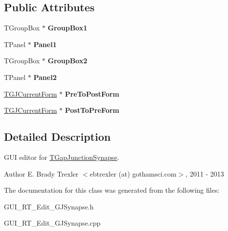 \subsection*{Public Attributes}
\begin{DoxyCompactItemize}
\item 
\hypertarget{class_t_gap_junction_synapse_form_a0b7aef4edb14bd866b8302c7516a45e2}{T\+Group\+Box $\ast$ {\bfseries Group\+Box1}}\label{class_t_gap_junction_synapse_form_a0b7aef4edb14bd866b8302c7516a45e2}

\item 
\hypertarget{class_t_gap_junction_synapse_form_a6b1b55bbe0f87f81ad8cc6ed4c2b0d0c}{T\+Panel $\ast$ {\bfseries Panel1}}\label{class_t_gap_junction_synapse_form_a6b1b55bbe0f87f81ad8cc6ed4c2b0d0c}

\item 
\hypertarget{class_t_gap_junction_synapse_form_a24b399fcc515a4df0c78f98985561bb5}{T\+Group\+Box $\ast$ {\bfseries Group\+Box2}}\label{class_t_gap_junction_synapse_form_a24b399fcc515a4df0c78f98985561bb5}

\item 
\hypertarget{class_t_gap_junction_synapse_form_a63a81abf58ffed566dacd8a285ede1e2}{T\+Panel $\ast$ {\bfseries Panel2}}\label{class_t_gap_junction_synapse_form_a63a81abf58ffed566dacd8a285ede1e2}

\item 
\hypertarget{class_t_gap_junction_synapse_form_af3abdda14fac4735ed075a15730b847a}{\hyperlink{class_t_g_j_current_form}{T\+G\+J\+Current\+Form} $\ast$ {\bfseries Pre\+To\+Post\+Form}}\label{class_t_gap_junction_synapse_form_af3abdda14fac4735ed075a15730b847a}

\item 
\hypertarget{class_t_gap_junction_synapse_form_a336e0fd04c208767a9ab1b087a958230}{\hyperlink{class_t_g_j_current_form}{T\+G\+J\+Current\+Form} $\ast$ {\bfseries Post\+To\+Pre\+Form}}\label{class_t_gap_junction_synapse_form_a336e0fd04c208767a9ab1b087a958230}

\end{DoxyCompactItemize}


\subsection{Detailed Description}
G\+U\+I editor for \hyperlink{class_t_gap_junction_synapse}{T\+Gap\+Junction\+Synapse}. 

\begin{DoxyAuthor}{Author}
E. Brady Trexler $<$ebtrexler (at) gothamsci.\+com$>$, 2011 -\/ 2013 
\end{DoxyAuthor}


The documentation for this class was generated from the following files\+:\begin{DoxyCompactItemize}
\item 
G\+U\+I\+\_\+\+R\+T\+\_\+\+Edit\+\_\+\+G\+J\+Synapse.\+h\item 
G\+U\+I\+\_\+\+R\+T\+\_\+\+Edit\+\_\+\+G\+J\+Synapse.\+cpp\end{DoxyCompactItemize}
